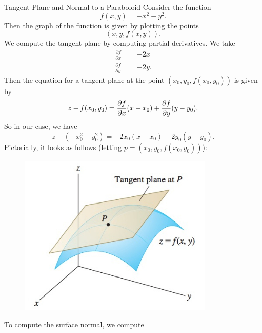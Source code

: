                                         \begin{ex}{Tangent Plane and Normal to a Paraboloid}
                                        Consider the function
                                        \[
                                        f(x,y)=-x^2-y^2.
                                        \]
                                        Then the graph of the function is given by plotting the points
                                        \[
                                        (x,y,f(x,y)).
                                        \]
                                        We compute the tangent plane by computing partial derivatives. We take
                                        \begin{align*}
                                        \frac{\partial f}{\partial x} &= -2x\\
                                        \frac{\partial f}{\partial y} &= -2y.
                                        \end{align*}
                                        Then the equation for a tangent plane at the point $(x_0,y_0,f(x_0,y_0))$ is given by
                                        \[
                                        z-f(x_0,y_0)=\frac{\partial f}{\partial x} (x-x_0)+\frac{\partial f}{\partial y} (y-y_0).
                                        \]
                                        So in our case, we have
                                        \[
                                        z-(-x_0^2-y_0^2)=-2x_0(x-x_0)-2y_0(y-y_0).
                                        \]
                                        Pictorially, it looks as follows (letting $p=(x_0,y_0,f(x_0,y_0))$):
                                        \begin{figure}[H]
                                            \centering
                                            \includegraphics[width=.4\textwidth]{Figures_Part_6/tangent-planes-1.png}
                                        \end{figure}
                                        To compute the surface normal, we compute

\end{ex}
